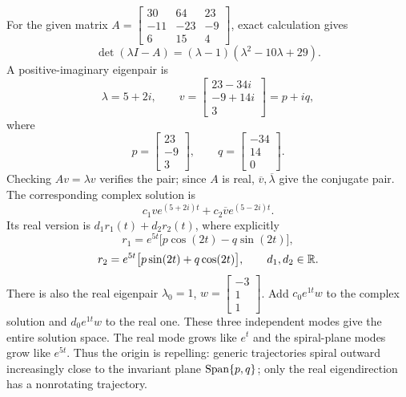 For the given matrix $A=\left[\begin{matrix}30 & 64 & 23\\-11 & -23 & -9\\6 & 15 & 4\end{matrix}\right]$, exact calculation gives
\[\det(\lambda I-A)=\left(\lambda - 1\right) \left(\lambda^{2} - 10 \lambda + 29\right).\]
A positive-imaginary eigenpair is
\[\lambda=5 + 2 i,\qquad v=\left[\begin{matrix}23 - 34 i\\-9 + 14 i\\3\end{matrix}\right]=p+iq,\]
where
\[p=\left[\begin{matrix}23\\-9\\3\end{matrix}\right],\qquad q=\left[\begin{matrix}-34\\14\\0\end{matrix}\right].\]
Checking $Av=\lambda v$ verifies the pair; since $A$ is real,
$\overline v,\overline\lambda$ give the conjugate pair.
The corresponding complex solution is
\[c_1ve^{(5 + 2 i)t}+c_2\overline v e^{(5 - 2 i)t}.
\]
Its real version is $d_1r_1(t)+d_2r_2(t)$, where explicitly
\[r_1=e^{5t}\bigl[p\cos(2t)-q\sin(2t)\bigr],\]
\[r_2=e^{5t}\bigl[p\sin(2t)+q\cos(2t)\bigr],\qquad d_1,d_2\in\mathbb{R}.\]
There is also the real eigenpair $\lambda_0=1$,
$w=\left[\begin{matrix}-3\\1\\1\end{matrix}\right]$. Add $c_0e^{1t}w$ to the
complex solution and $d_0e^{1t}w$ to the real one.
These three independent modes give the entire solution space.
The real mode grows like $e^t$ and the spiral-plane modes grow
like $e^{5t}$. Thus the origin is repelling: generic trajectories
spiral outward increasingly close to the invariant plane $\operatorname{Span}\{p,q\}$;
only the real eigendirection has a nonrotating trajectory.

